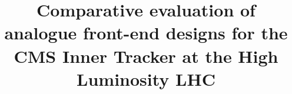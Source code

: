 \documentclass[a4paper,11pt]{article}
\title{Comparative evaluation of analogue front-end designs for the CMS Inner Tracker at the High Luminosity LHC}
\begin{document}
    \maketitle
    \flushbottom
    
    
    
    
    
    
    
    
    
    
\end{document}
